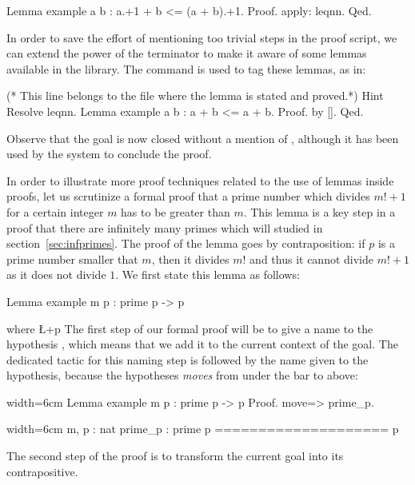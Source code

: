\begin{coq}{}{}
Lemma example a b : a.+1 + b <= (a + b).+1.
Proof. apply: leqnn. Qed.
\end{coq}
In order to save the effort of mentioning too trivial
steps in the proof script, we can extend the power of the 
terminator to make it aware of some lemmas available in
the library. The  command is used to tag these lemmas,
as in:

\begin{coq}{}{}
(* This line belongs to the file where the lemma is stated and proved.*)
Hint Resolve leqnn.
Lemma example a b : a + b <= a + b.
Proof.  by [].  Qed.
\end{coq}
Observe that the goal is now closed without a mention of ,
although it has been used by the system to conclude the proof.

In order to illustrate more proof techniques related to the use of
lemmas inside proofs, let us scrutinize a formal proof that a prime
number which divides $m! + 1$ for a certain integer $m$ has to be
greater than $m$. This lemma is a key step in a proof that there are
infinitely many primes which will studied in
section~\ref{sec:infprimes}. The proof of the lemma goes by
contraposition: if $p$ is a prime number smaller that $m$, then it
divides $m!$ and thus it cannot divide $m! + 1$ as it does not divide
$1$. We first state this lemma as follows:

\begin{coq}{}{}
Lemma example m p : prime p -> p %
\end{coq}
where \L+p %
The first step of our formal proof will be to give a name to the
hypothesis , which means that we add it to the
current context of the goal. The dedicated tactic for this naming step is
 followed by the name given to the hypothesis, because the
hypotheses \emph{moves} from under the bar to above:

\begin{coq}{}{width=6cm}
Lemma example m p : prime p ->
  p %
Proof.
move=> prime_p.
\end{coq}
\begin{coqout}{}{width=6cm}
m, p : nat
prime_p : prime p
====================
p %
\end{coqout}
The second step of the proof is to transform the current goal into its
contrapositive.

